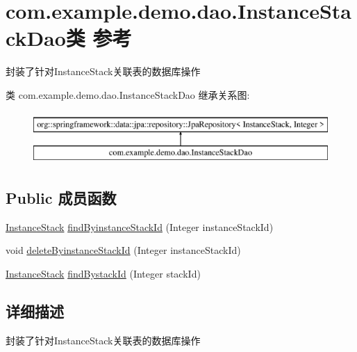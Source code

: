 \hypertarget{interfacecom_1_1example_1_1demo_1_1dao_1_1_instance_stack_dao}{}\section{com.\+example.\+demo.\+dao.\+Instance\+Stack\+Dao类 参考}
\label{interfacecom_1_1example_1_1demo_1_1dao_1_1_instance_stack_dao}


封装了针对\+Instance\+Stack关联表的数据库操作  


类 com.\+example.\+demo.\+dao.\+Instance\+Stack\+Dao 继承关系图\+:\begin{figure}[H]
\begin{center}
\leavevmode
\includegraphics[height=2.000000cm]{interfacecom_1_1example_1_1demo_1_1dao_1_1_instance_stack_dao}
\end{center}
\end{figure}
\subsection*{Public 成员函数}
\begin{DoxyCompactItemize}
\item 
\mbox{\hyperlink{classcom_1_1example_1_1demo_1_1modular_1_1_instance_stack}{Instance\+Stack}} \mbox{\hyperlink{interfacecom_1_1example_1_1demo_1_1dao_1_1_instance_stack_dao_ae9aca0729a0eab38422e764feeb90e6f}{find\+Byinstance\+Stack\+Id}} (Integer instance\+Stack\+Id)
\item 
void \mbox{\hyperlink{interfacecom_1_1example_1_1demo_1_1dao_1_1_instance_stack_dao_a84798bcfada3d07fea12a70cc50915e8}{delete\+Byinstance\+Stack\+Id}} (Integer instance\+Stack\+Id)
\item 
\mbox{\hyperlink{classcom_1_1example_1_1demo_1_1modular_1_1_instance_stack}{Instance\+Stack}} \mbox{\hyperlink{interfacecom_1_1example_1_1demo_1_1dao_1_1_instance_stack_dao_a1b64ca77ec2f8416bdd01a3ea2bc898b}{find\+Bystack\+Id}} (Integer stack\+Id)
\end{DoxyCompactItemize}


\subsection{详细描述}
封装了针对\+Instance\+Stack关联表的数据库操作 

